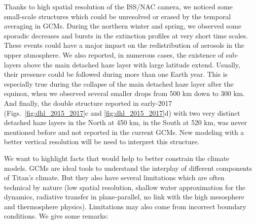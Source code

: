 Thanks to high spatial resolution of the ISS/NAC camera, we noticed some small-scale structures which could be unresolved or
erased by the temporal averaging in GCMs. During the northern winter and spring, we observed some sporadic decreases and
bursts in the extinction profiles at very short time scales. These events could have a major impact on the redistribution of
aerosols in the upper atmosphere. We also reported, in numerous cases, the existence of sub-layers above the main detached
haze layer with large latitude extend. Usually, their presence could be followed during more than one Earth year. This is
especially true during the collapse of the main detached haze layer after the equinox, when we observed several smaller
drops from 500 km down to 300 km. And finally, the double structure reported in early-2017
(Figs.~\ref{fig:dhl_2015_2017}c and \ref{fig:dhl_2015_2017}d) with two very distinct detached haze layers in the
North at 450 km, in the South at 520 km, was never mentioned before and not reported in the current GCMs. New modeling with a better vertical resolution will be need to interpret this structure.

We want to highlight facts that would help to better constrain the climate models.
GCMs are ideal tools to understand the interplay of different components of Titan's climate.
But they also have several limitations which are often technical by nature (low spatial resolution, shallow water
approximation for the dynamics, radiative transfer in plane-parallel, no link with the high mesosphere and thermosphere physics).
Limitations may also come from incorrect boundary conditions. We give some remarks:

